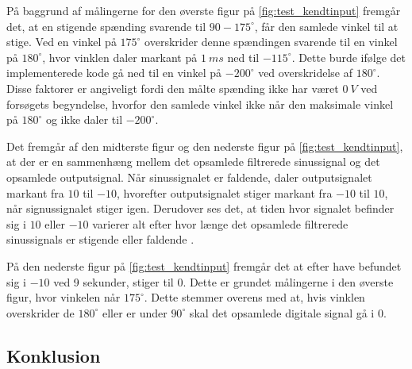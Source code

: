 På baggrund af målingerne for den øverste figur på \autoref{fig:test_kendtinput} fremgår det, at en stigende spænding svarende til $90-175^{\circ}$, får den samlede vinkel til at stige. Ved en vinkel på $175^{\circ}$ overskrider denne spændingen svarende til en vinkel på $180^{\circ}$, hvor vinklen daler markant på $1~ms$ ned til $-115^{\circ}$. 
Dette burde ifølge det implementerede kode gå ned til en vinkel på $-200^{\circ}$ ved overskridelse af $180^{\circ}$.
Disse faktorer er angiveligt fordi den målte spænding ikke har været $0~V$ ved forsøgets begyndelse, hvorfor den samlede vinkel ikke når den maksimale vinkel på $180^{\circ}$ og ikke daler til $-200^{\circ}$.

Det fremgår af den midterste figur og den nederste figur på \autoref{fig:test_kendtinput}, at der er en sammenhæng mellem det opsamlede filtrerede sinussignal og det opsamlede outputsignal. Når sinussignalet er faldende, daler outputsignalet markant fra $10$ til $-10$, hvorefter outputsignalet stiger markant fra $-10$ til $10$, når signussignalet stiger igen. Derudover ses det, at tiden hvor signalet befinder sig i $10$ eller $-10$ varierer alt efter hvor længe det opsamlede filtrerede sinussignals er stigende eller faldende .

På den nederste figur på \autoref{fig:test_kendtinput} fremgår det at efter have befundet sig i $-10$ ved 9 sekunder, stiger til $0$. Dette er grundet målingerne i den øverste figur, hvor vinkelen når $175^{\circ}$. Dette stemmer overens med at, hvis vinklen  overskrider de $180^{\circ}$ eller er under $90^{\circ}$ skal det opsamlede digitale signal gå i $0$. 

\subsection{Konklusion}
